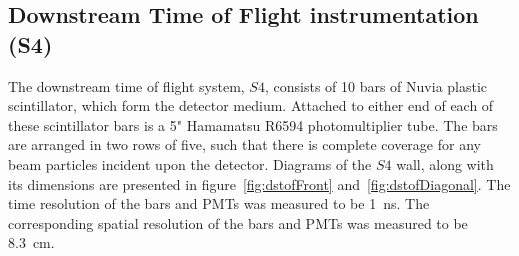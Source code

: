 	\subsection{Downstream Time of Flight instrumentation (S4)}
	
    The downstream time of flight system, $S4$, consists of 10 bars of Nuvia plastic scintillator, which form the detector medium. 
    Attached to either end of each of these scintillator bars is a 5" Hamamatsu R6594 photomultiplier tube. 
    The bars are arranged in two rows of five, such that there is complete coverage for any beam particles incident upon the detector. 
    Diagrams of the $S4$ wall, along with its dimensions are presented in figure~\ref{fig:dstofFront} and~\ref{fig:dstofDiagonal}.
    The time resolution of the bars and PMTs was measured to be 1~ns. The corresponding spatial resolution of the bars and PMTs was measured to be 8.3~cm.
    

